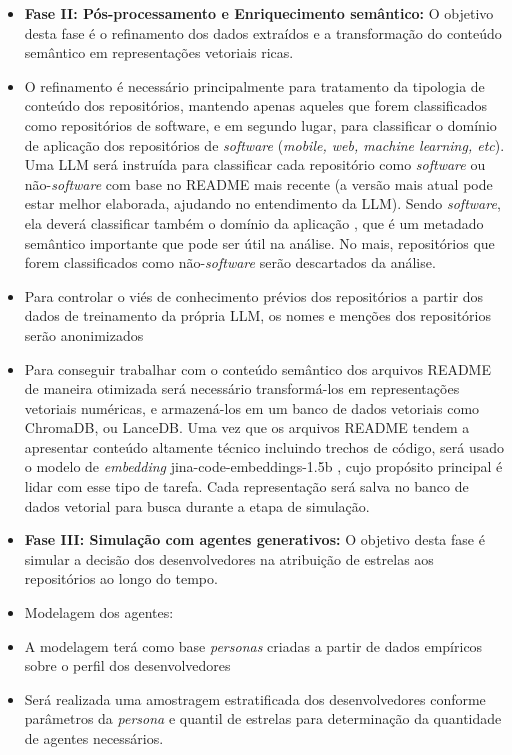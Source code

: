 \documentclass[12pt,oneside,a4paper,brazil,sumario=tradicional]{abntex2}
\begin{document}
\begin{itemize}
  \item \textbf{Fase II: Pós-processamento e Enriquecimento semântico: }O objetivo desta fase é o refinamento dos dados extraídos e a transformação do conteúdo semântico em representações vetoriais ricas.
  \item O refinamento é necessário principalmente para tratamento da tipologia de conteúdo dos repositórios, mantendo apenas aqueles que forem classificados como repositórios de software, e em segundo lugar, para classificar o domínio de aplicação dos repositórios de \textit{software }(\textit{mobile, web, machine learning, etc}). Uma LLM será instruída para classificar cada repositório como \textit{software }ou não-\textit{software} com base no README mais recente (a versão mais atual pode estar melhor elaborada, ajudando no entendimento da LLM). Sendo \textit{software}, ela deverá classificar também o domínio da aplicação \parencite{borges2018}, que é um metadado semântico importante que pode ser útil na análise. No mais, repositórios que forem classificados como não-\textit{software }serão descartados da análise.
  \item Para controlar o viés de conhecimento prévios dos repositórios a partir dos dados de treinamento da própria LLM, os nomes e menções dos repositórios serão anonimizados
  \item Para conseguir trabalhar com o conteúdo semântico dos arquivos README de maneira otimizada será necessário transformá-los em representações vetoriais numéricas, e armazená-los em um banco de dados vetoriais como ChromaDB, ou LanceDB. Uma vez que os arquivos README tendem a apresentar conteúdo altamente técnico incluindo trechos de código, será usado o modelo de \textit{embedding }jina-code-embeddings-1.5b \parencite{kryvosheieva2025}, cujo propósito principal é lidar com esse tipo de  tarefa. Cada representação será salva no banco de dados vetorial para busca durante a etapa de simulação.
  \item \textbf{Fase III: Simulação com agentes generativos:} O objetivo desta fase é simular a decisão dos desenvolvedores na atribuição de estrelas aos repositórios ao longo do tempo.
  \item Modelagem dos agentes:
  \item A modelagem terá como base \textit{personas }criadas a partir de dados empíricos sobre o perfil dos desenvolvedores \parencite{borges2018, stackoverflow2025, github2025}
  \item Será realizada uma amostragem estratificada dos desenvolvedores conforme parâmetros da \textit{persona }e quantil de estrelas para determinação da quantidade de agentes necessários.

\end{itemize}
\end{document}
